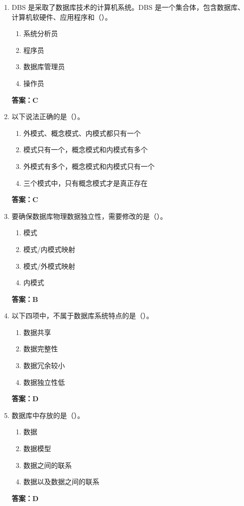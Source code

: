 \documentclass[12pt, a4paper]{article}
\begin{document}
\begin{enumerate}[label=\arabic*.]
	\item DBS 是采取了数据库技术的计算机系统。DBS 是一个集合体，包含数据库、计算机软硬件、应用程序和（\quad）。
	      \begin{enumerate}
		      \item 系统分析员
		      \item 程序员
		      \item 数据库管理员
		      \item 操作员
	      \end{enumerate}
	      \textbf{答案：C}

	\item 以下说法正确的是（\quad）。
	      \begin{enumerate}
		      \item 外模式、概念模式、内模式都只有一个
		      \item 模式只有一个，概念模式和内模式有多个
		      \item 外模式有多个，概念模式和内模式只有一个
		      \item 三个模式中，只有概念模式才是真正存在
	      \end{enumerate}
	      \textbf{答案：C}

	\item 要确保数据库物理数据独立性，需要修改的是（\quad）。
	      \begin{enumerate}
		      \item 模式
		      \item 模式/内模式映射
		      \item 模式/外模式映射
		      \item 内模式
	      \end{enumerate}
	      \textbf{答案：B}

	\item 以下四项中，不属于数据库系统特点的是（\quad）。
	      \begin{enumerate}
		      \item 数据共享
		      \item 数据完整性
		      \item 数据冗余较小
		      \item 数据独立性低
	      \end{enumerate}
	      \textbf{答案：D}

	\item 数据库中存放的是（\quad）。
	      \begin{enumerate}
		      \item 数据
		      \item 数据模型
		      \item 数据之间的联系
		      \item 数据以及数据之间的联系
	      \end{enumerate}
	      \textbf{答案：D}


\end{enumerate}
\end{document}
